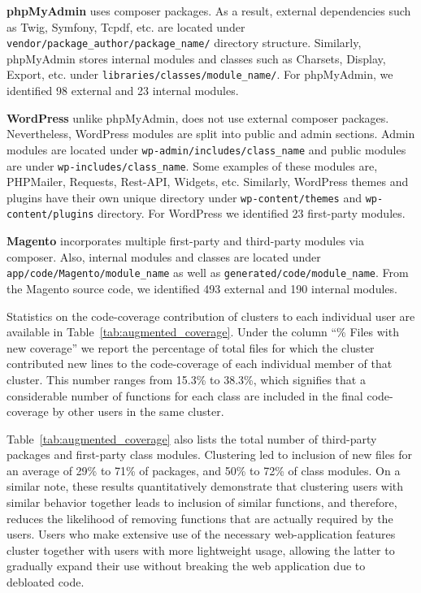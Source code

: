 \textbf{phpMyAdmin} uses composer packages. As a result, external dependencies such as Twig, Symfony, Tcpdf, etc. are located under \texttt{vendor/package\_author/package\_name/} directory structure.
Similarly, phpMyAdmin stores internal modules and classes such as Charsets, Display, Export, etc. under \texttt{libraries/classes/module\_name/}. 
For phpMyAdmin, we identified 98 external and 23 internal modules.

\textbf{WordPress} unlike phpMyAdmin, does not use external composer packages. 
Nevertheless, WordPress modules are split into public and admin sections. 
Admin modules are located under \texttt{wp-admin/includes/class\_name} and public modules are under \texttt{wp-includes/class\_name}. 
Some examples of these modules are, PHPMailer, Requests, Rest-API, Widgets, etc.
Similarly, WordPress themes and plugins have their own unique directory under \texttt{wp-content/themes} and \texttt{wp-content/plugins} directory. 
For WordPress we identified 23 first-party modules. 

\textbf{Magento} incorporates multiple first-party and third-party modules via composer. 
Also, internal modules and classes are located under \texttt{app/code/Magento/module\_name} as well as \texttt{generated/code/module\_name}. 
From the Magento source code, we identified 493 external and 190 internal modules. 

Statistics on the code-coverage contribution of clusters to each individual user are available in Table~\ref{tab:augmented_coverage}. 
Under the column ``\% Files with new coverage'' we report the percentage of total files for which the cluster contributed new lines to the code-coverage of each individual member of that cluster. 
This number ranges from 15.3\% to 38.3\%, which signifies that a considerable number of functions for each class are included in the final code-coverage by other users in the same cluster. 

Table~\ref{tab:augmented_coverage} also lists the total number of third-party packages and first-party class modules. 
Clustering led to inclusion of new files for an average of 29\% to 71\% of packages, and 50\% to 72\% of class modules. 
On a similar note, these results quantitatively demonstrate that clustering users with similar behavior together leads to inclusion of similar functions, and therefore, reduces the likelihood of removing functions that are actually required by the users. 
Users who make extensive use of the necessary web-application features cluster together with users with more lightweight usage, allowing the latter to gradually expand their use without breaking the web application due to debloated code. 

